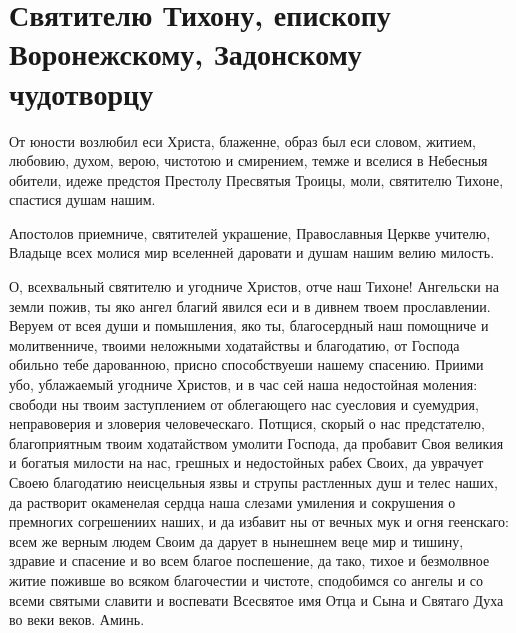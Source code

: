 \section{Святителю Тихону, епископу Воронежскому, Задонскому чудотворцу}\begin{mymulticols}


От юности возлюбил еси Христа, блаженне, образ был еси словом, житием, любовию, духом, верою, чистотою и смирением, темже и вселися в Небесныя обители, идеже предстоя Престолу Пресвятыя Троицы, моли, святителю Тихоне, спастися душам нашим.


Апостолов приемниче, святителей украшение, Православныя Церкве учителю, Владыце всех молися мир вселенней даровати и душам нашим велию милость.


О, всехвальный святителю и угодниче Христов, отче наш Тихоне! Ангельски на земли пожив, ты яко ангел благий явился еси и в дивнем твоем прославлении. Веруем от всея души и помышления, яко ты, благосердный наш помощниче и молитвенниче, твоими неложными ходатайствы и благодатию, от Господа обильно тебе дарованною, присно способствуеши нашему спасению. Приими убо, ублажаемый угодниче Христов, и в час сей наша недостойная моления: свободи ны твоим заступлением от облегающего нас суесловия и суемудрия, неправоверия и зловерия человеческаго. Потщися, скорый о нас предстателю, благоприятным твоим ходатайством умолити Господа, да пробавит Своя великия и богатыя милости на нас, грешных и недостойных рабех Своих, да уврачует Своею благодатию неисцельныя язвы и струпы растленных душ и телес наших, да растворит окаменелая сердца наша слезами умиления и сокрушения о премногих согрешениих наших, и да избавит ны от вечных мук и огня геенскаго: всем же верным людем Своим да дарует в нынешнем веце мир и тишину, здравие и спасение и во всем благое поспешение, да тако, тихое и безмолвное житие поживше во всяком благочестии и чистоте, сподобимся со ангелы и со всеми святыми славити и воспевати Всесвятое имя Отца и Сына и Святаго Духа во веки веков. Аминь.

\end{mymulticols}

